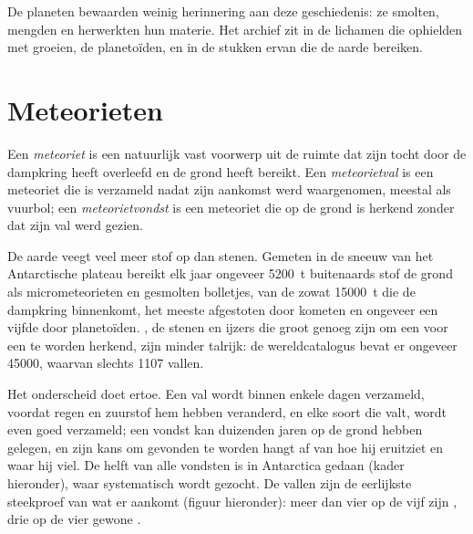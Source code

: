 De planeten bewaarden weinig herinnering aan deze geschiedenis: ze smolten, mengden en
herwerkten hun materie. Het archief zit in de lichamen die ophielden met groeien, de
planetoïden, en in de stukken ervan die de aarde bereiken.

\section{Meteorieten}

\begin{definition}
\label{def:b2:planet-formation-meteorites:fall-find}
Een \emph{meteoriet} is een natuurlijk vast voorwerp uit de ruimte dat
zijn tocht door de dampkring heeft overleefd en de grond heeft bereikt. Een
\emph{meteorietval} is een meteoriet die is verzameld nadat zijn
aankomst werd waargenomen, meestal als vuurbol; een
\emph{meteorietvondst} is een meteoriet die op de grond is herkend zonder dat zijn val
werd gezien.
\end{definition}

De aarde veegt veel meer stof op dan stenen. Gemeten in de sneeuw van het
Antarctische plateau bereikt elk jaar ongeveer \qty{5200}{t} buitenaards stof de
grond als micrometeorieten en gesmolten bolletjes, van de zowat
\qty{15000}{t} die de dampkring binnenkomt, het meeste afgestoten door kometen en ongeveer een
vijfde door planetoïden. , de stenen en ijzers die groot genoeg zijn om
een voor een te worden herkend, zijn minder talrijk: de wereldcatalogus bevat er ongeveer
\num{45000}, waarvan slechts \num{1107} vallen.

Het onderscheid doet ertoe. Een val wordt binnen enkele dagen verzameld, voordat regen en
zuurstof hem hebben veranderd, en elke soort  die valt, wordt even goed
verzameld; een vondst kan duizenden jaren op de grond hebben gelegen, en zijn
kans om gevonden te worden hangt af van hoe hij eruitziet en waar hij viel. De helft van alle
vondsten is in Antarctica gedaan (kader hieronder), waar systematisch wordt
gezocht. De vallen zijn de eerlijkste steekproef van wat er aankomt (figuur hieronder):
meer dan vier op de vijf zijn , drie op de vier gewone .

